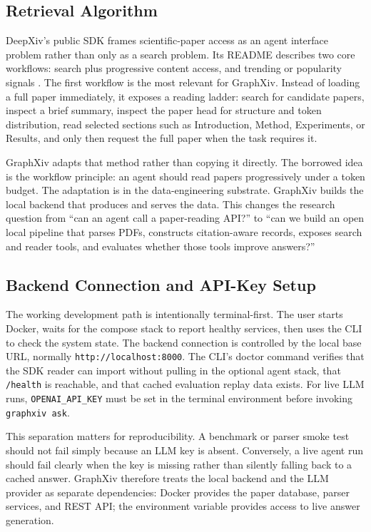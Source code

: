 \documentclass[10pt]{article}
\begin{document}
\subsection{Retrieval Algorithm}

DeepXiv's public SDK frames scientific-paper access as an agent interface problem rather than only as a search problem. Its README describes two core workflows: search plus progressive content access, and trending or popularity signals \citep{deepxivgithub}. The first workflow is the most relevant for GraphXiv. Instead of loading a full paper immediately, it exposes a reading ladder: search for candidate papers, inspect a brief summary, inspect the paper head for structure and token distribution, read selected sections such as Introduction, Method, Experiments, or Results, and only then request the full paper when the task requires it.

GraphXiv adapts that method rather than copying it directly. The borrowed idea is the workflow principle: an agent should read papers progressively under a token budget. The adaptation is in the data-engineering substrate. GraphXiv builds the local backend that produces and serves the data. This changes the research question from ``can an agent call a paper-reading API?'' to ``can we build an open local pipeline that parses PDFs, constructs citation-aware records, exposes search and reader tools, and evaluates whether those tools improve answers?''


\subsection{Backend Connection and API-Key Setup}

The working development path is intentionally terminal-first. The user starts Docker, waits for the compose stack to report healthy services, then uses the CLI to check the system state. The backend connection is controlled by the local base URL, normally \texttt{http://localhost:8000}. The CLI's doctor command verifies that the SDK reader can import without pulling in the optional agent stack, that \texttt{/health} is reachable, and that cached evaluation replay data exists. For live LLM runs, \texttt{OPENAI\_API\_KEY} must be set in the terminal environment before invoking \texttt{graphxiv ask}.

This separation matters for reproducibility. A benchmark or parser smoke test should not fail simply because an LLM key is absent. Conversely, a live agent run should fail clearly when the key is missing rather than silently falling back to a cached answer. GraphXiv therefore treats the local backend and the LLM provider as separate dependencies: Docker provides the paper database, parser services, and REST API; the environment variable provides access to live answer generation.
\end{document}
